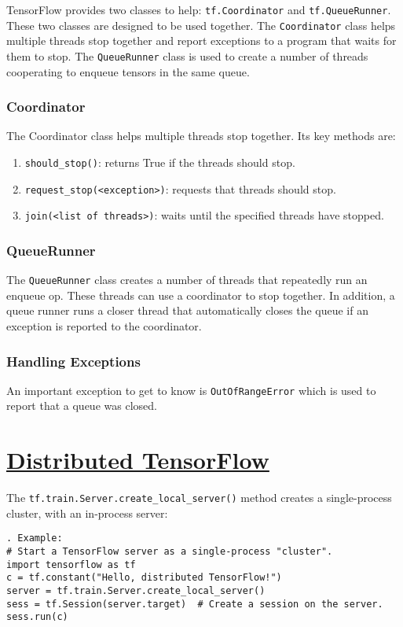 \documentclass[11pt,a4paper]{article}
\begin{document}
TensorFlow provides two classes to help: \texttt{tf.Coordinator} and \texttt{tf.QueueRunner}. These two classes are designed to be used together. The \texttt{Coordinator} class helps multiple threads stop together and report exceptions to a program that waits for them to stop. The \texttt{QueueRunner} class is used to create a number of threads cooperating to enqueue tensors in the same queue.

\subsubsection{Coordinator}
The Coordinator class helps multiple threads stop together. Its key methods are: 
\begin{enumerate}
\item \texttt{should\_stop()}: returns True if the threads should stop. 
\item \texttt{request\_stop(<exception>)}: requests that threads should stop. 
\item \texttt{join(<list of threads>)}: waits until the specified threads have stopped. 
\end{enumerate}
\subsubsection{QueueRunner}
The \texttt{QueueRunner} class creates a number of threads that repeatedly run an enqueue op. These threads can use a coordinator to stop together. In addition, a queue runner runs a closer thread that automatically closes the queue if an exception is reported to the coordinator.

\subsubsection{Handling Exceptions}
An important exception to get to know is \texttt{OutOfRangeError} which is used to report that a queue was closed. 

\section{\href{www.tensorflow.org/versions/r0.11/how_tos/distributed/index.html}{Distributed TensorFlow}}
The \texttt{tf.train.Server.create\_local\_server()} method creates a single-process cluster, with an in-process server:
\begin{lstlisting}. Example: 
# Start a TensorFlow server as a single-process "cluster".
import tensorflow as tf
c = tf.constant("Hello, distributed TensorFlow!")
server = tf.train.Server.create_local_server()
sess = tf.Session(server.target)  # Create a session on the server.
sess.run(c)
  \end{lstlisting}
  
\end{document}

